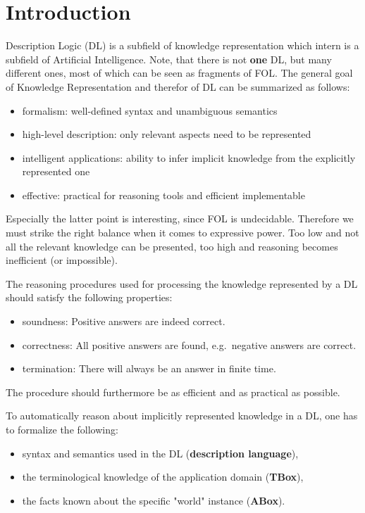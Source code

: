 \chapter{Introduction}
Description Logic (DL) is a subfield of knowledge representation which intern is a subfield of Artificial Intelligence.
Note, that there is not \textbf{one} DL, but many different ones, most of which can be seen as fragments of FOL.
The general goal of Knowledge Representation and therefor of DL can be summarized as follows:
\begin{itemize}
	\item formalism: well-defined syntax and unambiguous semantics
	\item high-level description: only relevant aspects need to be represented
	\item intelligent applications: ability to infer implicit knowledge from the explicitly represented one
	\item effective: practical for reasoning tools and efficient implementable
\end{itemize}
Especially the latter point is interesting, since FOL is undecidable.
Therefore we must strike the right balance when it comes to expressive power.
Too low and not all the relevant knowledge can be presented, too high and reasoning becomes inefficient (or impossible).

The reasoning procedures used for processing the knowledge represented by a DL should satisfy the following properties:
\begin{itemize}
	\item soundness: Positive answers are indeed correct. 
	\item correctness: All positive answers are found, e.g.\ negative answers are correct.
	\item termination: There will always be an answer in finite time.
\end{itemize}
The procedure should furthermore be as efficient and as practical as possible.

To automatically reason about implicitly represented knowledge in a DL, one has to formalize the following:
\begin{itemize}
	\item syntax and semantics used in the DL (\textbf{description language}),
	\item the terminological knowledge of the application domain (\textbf{TBox}),
	\item the facts known about the specific "world" instance (\textbf{ABox}).
\end{itemize}


